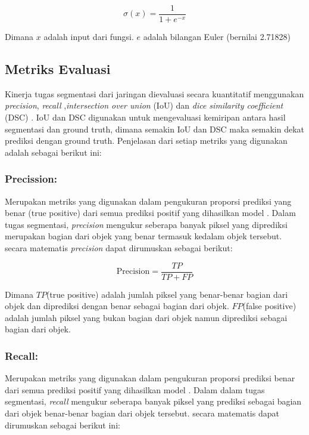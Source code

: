 \begin{equation}
	\sigma(x) = \frac{1}{1 + e^{-x}}
\end{equation}

Dimana \(x\) adalah input dari fungsi. \(e\) adalah bilangan Euler (bernilai 2.71828)


\subsection{Metriks Evaluasi}
\noindent Kinerja tugas segmentasi dari jaringan dievaluasi secara kuantitatif menggunakan \textit{precision}, \textit{recall} ,\textit{intersection over union }(IoU) dan \textit{dice similarity coefficient }(DSC) \cite{jiang_iu-net_2023}. IoU dan DSC digunakan untuk mengevaluasi kemiripan antara hasil segmentasi dan ground truth, dimana semakin IoU dan DSC maka semakin dekat prediksi dengan ground truth. Penjelasan dari setiap metriks yang digunakan adalah sebagai berikut ini:

\subsubsection{Precission:}
\noindent Merupakan metriks yang digunakan dalam pengukuran proporsi prediksi yang benar (true positive) dari semua prediksi positif yang dihasilkan model \cite{jiang_iu-net_2023}. Dalam tugas segmentasi, \textit{precision} mengukur seberapa banyak piksel yang diprediksi merupakan bagian dari objek yang benar termasuk kedalam objek tersebut. secara matematis \textit{precision} dapat dirumuskan sebagai berikut:

\begin{equation}
	\text{Precision} = \frac{TP}{TP + FP}
\end{equation}

\noindent Dimana \(TP\)(true positive) adalah jumlah piksel yang benar-benar bagian dari objek dan diprediksi dengan benar sebagai bagian dari objek. \(FP\)(false positive) adalah jumlah piksel yang bukan bagian dari objek namun diprediksi sebagai bagian dari objek.

\subsubsection{Recall:}
\noindent Merupakan metriks yang digunakan dalam pengukuran proporsi prediksi benar dari semua prediksi positif yang dihasilkan model \cite{jiang_iu-net_2023}.  Dalam dalam tugas segmentasi, \textit{recall} mengukur seberapa banyak piksel yang prediksi sebagai bagian dari objek benar-benar bagian dari objek tersebut. secara matematis dapat dirumuskan sebagai berikut ini:

